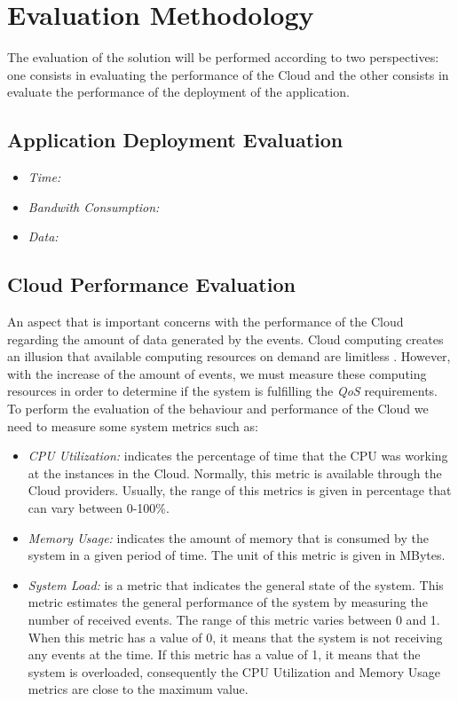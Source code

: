 \section{Evaluation Methodology}
\label{sec:evaluation}
The evaluation of the solution will be performed according to two perspectives: one consists in
evaluating the performance of the Cloud and the other consists in evaluate the performance
of the deployment of the application.
\subsection{Application Deployment Evaluation}
\label{sub:application_deployment_evaluation}
\begin{itemize}
  \item \textit{Time:}
  \item \textit{Bandwith Consumption:}
  \item \textit{Data:} 
\end{itemize}
\subsection{Cloud Performance Evaluation}
\label{subs:cloud_performance_evaluation}
An aspect that is important concerns with the performance of the Cloud regarding the amount
of data generated by the events. Cloud computing creates an illusion that available computing
resources on demand are limitless \cite{armbrust2009m}. However, with the increase of the amount of
events, we must measure these computing resources in order to determine if the system is fulfilling
the \textit{QoS} requirements. To perform the evaluation of the behaviour and performance of the Cloud
we need to measure some system metrics such as:
\begin{itemize}
  \item \textit{CPU Utilization:} indicates the percentage of time that the CPU was working at
  the instances in the Cloud. Normally, this metric is available through the Cloud providers.
  Usually, the range of this metrics is given in percentage that can vary between 0-100\%.
  \item \textit{Memory Usage:} indicates the amount of memory that is consumed by the system in a
  given period of time. The unit of this metric is given in MBytes.
  \item \textit{System Load:} is a metric that indicates the general state of the system.
  This metric estimates the general performance of the system by measuring the number of received events.
  The range of this metric varies between 0 and 1. When this metric has a value of 0, it means that the
  system is not receiving any events at the time. If this metric has a value of 1, it means that the system
  is overloaded, consequently the CPU Utilization and Memory Usage metrics are close to the maximum value.
\end{itemize}
